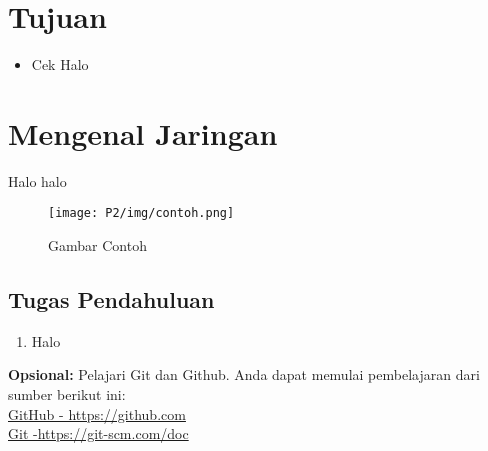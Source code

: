 \section{Tujuan}
\begin{itemize}[label=$\bullet$, itemsep=-1pt, leftmargin=*]
	\item Cek Halo
\end{itemize}

\section{Mengenal Jaringan}
Halo halo

\begin{figure}[H]
	\centering
	\texttt{[image: P2/img/contoh.png]}
	\caption{Gambar Contoh}
	\label{fig:gambarcontoh}
\end{figure}

\subsection{Tugas Pendahuluan}
\begin{enumerate}
	\item Halo
\end{enumerate}


\begin{center}
	\colorbox{cyan!30}{\parbox{0.8\linewidth}{\textbf{Opsional:} Pelajari Git dan Github. Anda dapat memulai pembelajaran dari sumber berikut ini: \\ \href{https://github.com}{GitHub - https://github.com} \\ \href{https://git-scm.com/doc}{Git -https://git-scm.com/doc}}}
\end{center}